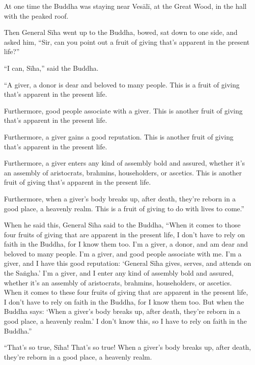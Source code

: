 \documentclass[12pt,openany]{book}%
\begin{document}
At one time the Buddha was staying near \textsanskrit{Vesālī}, at the Great Wood, in the hall with the peaked roof. 

Then General \textsanskrit{Sīha} went up to the Buddha, bowed, sat down to one side, and asked him, “Sir, can you point out a fruit of giving that’s apparent in the present life?” 

“I can, \textsanskrit{Sīha},” said the Buddha. 

“A giver, a donor is dear and beloved to many people. This is a fruit of giving that’s apparent in the present life. 

Furthermore, good people associate with a giver. This is another fruit of giving that’s apparent in the present life. 

Furthermore, a giver gains a good reputation. This is another fruit of giving that’s apparent in the present life. 

Furthermore, a giver enters any kind of assembly bold and assured, whether it’s an assembly of aristocrats, brahmins, householders, or ascetics. This is another fruit of giving that’s apparent in the present life. 

Furthermore, when a giver’s body breaks up, after death, they’re reborn in a good place, a heavenly realm. This is a fruit of giving to do with lives to come.” 

When he said this, General \textsanskrit{Sīha} said to the Buddha, “When it comes to those four fruits of giving that are apparent in the present life, I don’t have to rely on faith in the Buddha, for I know them too. I’m a giver, a donor, and am dear and beloved to many people. I’m a giver, and good people associate with me. I’m a giver, and I have this good reputation: ‘General \textsanskrit{Sīha} gives, serves, and attends on the \textsanskrit{Saṅgha}.’ I’m a giver, and I enter any kind of assembly bold and assured, whether it’s an assembly of aristocrats, brahmins, householders, or ascetics. When it comes to these four fruits of giving that are apparent in the present life, I don’t have to rely on faith in the Buddha, for I know them too. But when the Buddha says: ‘When a giver’s body breaks up, after death, they’re reborn in a good place, a heavenly realm.’ I don’t know this, so I have to rely on faith in the Buddha.” 

“That’s so true, \textsanskrit{Sīha}! That’s so true! When a giver’s body breaks up, after death, they’re reborn in a good place, a heavenly realm. 
\end{document}
